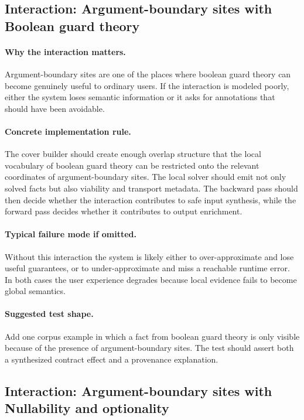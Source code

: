 \documentclass[11pt]{report}
\theoremstyle{definition}
\theoremstyle{plain}
\begin{document}
\subsection{Interaction: Argument-boundary sites with Boolean guard theory}

\paragraph{Why the interaction matters.}
Argument-boundary sites are one of the places where boolean guard theory can become
genuinely useful to ordinary users. If the interaction is modeled poorly,
either the system loses semantic information or it asks for annotations that
should have been avoidable.

\paragraph{Concrete implementation rule.}
The cover builder should create enough overlap structure that the local
vocabulary of boolean guard theory can be restricted onto the relevant
coordinates of argument-boundary sites. The local solver should emit not only
solved facts but also viability and transport metadata. The backward pass
should then decide whether the interaction contributes to safe input
synthesis, while the forward pass decides whether it contributes to output
enrichment.

\paragraph{Typical failure mode if omitted.}
Without this interaction the system is likely either to over-approximate and
lose useful guarantees, or to under-approximate and miss a reachable runtime
error. In both cases the user experience degrades because local evidence
fails to become global semantics.

\paragraph{Suggested test shape.}
Add one corpus example in which a fact from boolean guard theory is only
visible because of the presence of argument-boundary sites. The test should
assert both a synthesized contract effect and a provenance explanation.

\subsection{Interaction: Argument-boundary sites with Nullability and optionality}
\end{document}
